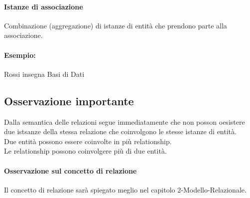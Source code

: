 \paragraph*{Istanze di associazione}
Combinazione (aggregazione) di istanze di entità che prendono parte alla associazione.
\paragraph*{Esempio:} Rossi insegna Basi di Dati
\subsection*{Osservazione importante}
Dalla semantica delle relazioni segue immediatamente che non posson oesistere due
istsanze della stessa relazione che coinvolgono le stesse istanze di entità.
\\ Due entità possono essere coinvolte in più relationship.
\\ Le relationship possono coinvolgere più di due entità.

\paragraph*{Osservazione sul concetto di relazione} Il concetto di relazione sarà
spiegato meglio nel capitolo 2-Modello-Relazionale.

